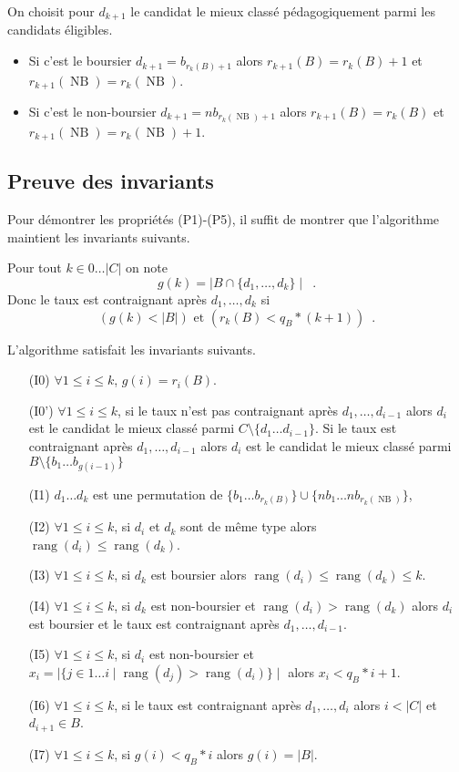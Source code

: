 \documentclass{article}
\DeclareMathOperator{\rang}{rang}
\DeclareMathOperator{\NB}{NB}
\begin{document}
On choisit pour $d_{k+1}$ le candidat le mieux classé pédagogiquement parmi les candidats
éligibles.
 \begin{itemize}
 \item
Si c'est le boursier $d_{k+1}=b_{r_k(B) + 1}$ alors
$r_{k+1}(B)=r_k(B) + 1$ et $r_{k+1}(\NB)=r_k(\NB)$.
 \item
Si c'est le non-boursier $d_{k+1}=nb_{r_k(\NB) + 1}$ alors
$r_{k+1}(B)=r_k(B) $ et $r_{k+1}(\NB)=r_k(\NB) + 1$.
\end{itemize}
 
  
 
\subsection{Preuve des invariants}

Pour démontrer les propriétés (P1)-(P5),
il suffit de montrer que l'algorithme maintient les invariants suivants.

Pour tout $k\in 0\ldots |C|$ on note
\[
g(k)
=
\mid B \cap \{d_1,\ldots , d_k\}\mid\enspace.
\]
Donc le taux est contraignant après $d_1,\ldots, d_k$
si 
\[
( g(k) < |B|) \text{ et } (r_k(B) < q_B * (k+1))\enspace.
\]

L'algorithme satisfait les invariants suivants.
 \begin{itemize}
 \item[(I0)]
$\forall 1 \leq i \leq k$,   $g(i) = r_i(B)$.
\item[(I0')]
 $\forall 1 \leq i \leq k$,   si le taux n'est pas contraignant 
 après $d_1,\ldots, d_{i-1}$
 alors $d_i$ est le candidat le mieux classé parmi
 $C \setminus \{d_1\ldots d_{i-1}\}$.
 Si le taux est  contraignant 
  après $d_1,\ldots, d_{i-1}$
 alors $d_i$ est le candidat le mieux classé parmi
 $B \setminus \{b_1\ldots b_{g(i-1)}\}$
 \item[(I1)]
$d_1\ldots d_{k}$ est une permutation de $\{b_1\ldots b_{r_k(B)}\} \cup \{nb_1\ldots nb_{r_k(\NB)}\}$,

 \item[(I2)]
 $\forall 1 \leq i \leq k$,
 si $d_i$ et $d_k$ sont de même type alors $\rang(d_i) \leq \rang(d_k)$.
 \item[(I3)]
 $\forall 1 \leq i \leq k$,
 si $d_k$ est boursier alors $\rang(d_i) \leq \rang(d_k) \leq k$.
 \item[(I4)]
 $\forall 1 \leq i \leq k$,
 si $d_k$ est non-boursier  et $\rang(d_i) > \rang(d_k)$
 alors $d_i$ est boursier et le taux est contraignant 
  après $d_1,\ldots, d_{i-1}$.
 \item[(I5)]
 $\forall 1 \leq i \leq k$,
 si $d_i$ est non-boursier et $x_i=\mid \{ j \in 1\ldots i \mid \rang(d_j) > \rang(d_i)\} \mid $
 alors $x_i < q_B * i + 1$.
 \item[(I6)]
 $\forall 1 \leq i \leq k$,
 si le taux est contraignant  après $d_1,\ldots, d_{i}$
 alors $i < |C|$ et $d_{i+1} \in B$.
 \item[(I7)]
 $\forall 1 \leq i \leq k$,
 si  $g(i)  < q_B * i$ alors $g(i)=|B|$.
 \end{itemize}
\end{document}
